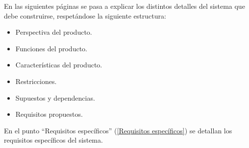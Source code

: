 En las siguientes páginas se pasa a explicar los distintos detalles del sistema que debe construirse, respetándose la siguiente estructura:

\begin{itemize}
    \item Perspectiva del producto.
    \item Funciones del producto.
    \item Características del producto.
    \item Restricciones.
    \item Supuestos y dependencias.
    \item Requisitos propuestos.
\end{itemize}

En el punto ``Requisitos específicos'' (\ref{Requisitos específicos}) se detallan los requisitos específicos del sistema.